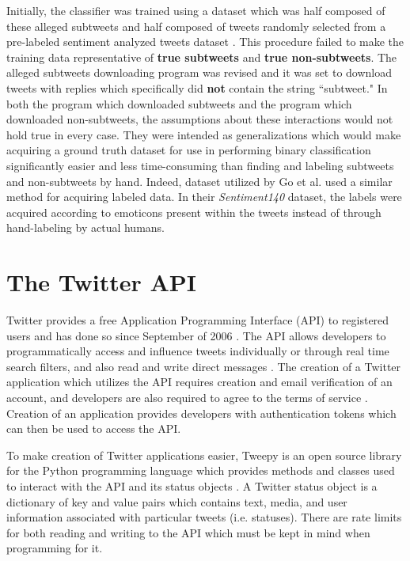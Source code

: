 \documentclass[11pt, twoside, reqno]{book}
\begin{document}
Initially, the classifier was trained using a dataset which was half composed of these alleged subtweets and half composed of tweets randomly selected from a pre-labeled sentiment analyzed tweets dataset \cite{go_dataset}. This procedure failed to make the training data representative of \textbf{true subtweets} and \textbf{true non-subtweets}. The alleged subtweets downloading program was revised and it was set to download tweets with replies which specifically did \textbf{not} contain the string ``subtweet." In both the program which downloaded subtweets and the program which downloaded non-subtweets, the assumptions about these interactions would not hold true in every case. They were intended as generalizations which would make acquiring a ground truth dataset for use in performing binary classification significantly easier and less time-consuming than finding and labeling subtweets and non-subtweets by hand. Indeed, dataset utilized by Go et al. used a similar method for acquiring labeled data. In their \textit{Sentiment140} dataset, the labels were acquired according to emoticons present within the tweets instead of through hand-labeling by actual humans. 

\section{The Twitter API}
\label{twitter_api}

Twitter provides a free Application Programming Interface (API) to registered users and has done so since September of 2006 \cite{twitter_api_start}. The API allows developers to programmatically access and influence tweets individually or through real time search filters, and also read and write direct messages \cite{twitter_api_docs}. The creation of a Twitter application which utilizes the API requires creation and email verification of an account, and developers are also required to agree to the terms of service \cite{twitter_tos}. Creation of an application provides developers with authentication tokens which can then be used to access the API.

To make creation of Twitter applications easier, Tweepy \cite{tweepy_python} is an open source library for the Python programming language which provides methods and classes used to interact with the API and its status objects \cite{tweepy_status_object}. A Twitter status object is a dictionary of key and value pairs which contains text, media, and user information associated with particular tweets (i.e. statuses). There are rate limits for both reading and writing to the API which must be kept in mind when programming for it.
\end{document}
